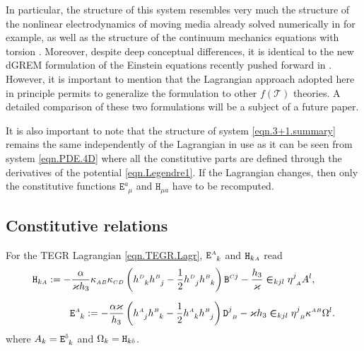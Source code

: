 \documentclass[
10pt, %
a4paper, %
oneside, %
headinclude,footinclude, %
BCOR5mm, %
]{scrartcl}
\newcommand{\sA}{\mathsmaller A}
\newcommand{\sB}{\mathsmaller B}
\newcommand{\sC}{\mathsmaller C}
\newcommand{\sD}{\mathsmaller D}
\newcommand{\mg}[1]{\kappa_{#1}}			%
\newcommand{\MG}[1]{\kappa^{#1}}			%
\newcommand{\tetrsymbol}{h}
\newcommand{\itetrsymbol}{\eta}
\newcommand{\itetr}[2]{\itetrsymbol^{#1}_{\phantom{#1}#2}}
\newcommand{\tetr}[2]{\tetrsymbol^{#1}_{\phantom{#1}#2}}
\newcommand{\detTetr}{\tetrsymbol}
\newcommand{\Dfin}[2]{\mathtt{D}_{\phantom{#2}#1}^{#2}}	%
\newcommand{\Hfin}[2]{\mathtt{H}_{#2#1}}	%
\newcommand{\Efin}[2]{\mathtt{E}^{#1}_{\phantom{#1}#2}}	%
\newcommand{\Ufin}{\mathtt{U}}
\newcommand{\Bfin}[2]{\mathtt{B}^{#1#2}}	%
\newcommand{\LCsymb}{\bm{\in}}    %
\newcommand{\indalg}[1]{\hat{\mathsmaller{#1}}}
\newcommand{\Tscal}{\mathcal{T}}		%
\begin{document}
In particular, the structure of this system resembles very much the structure of the nonlinear 
electrodynamics of 
moving media already solved numerically in \cite{DPRZ2017} for example, as well as the structure of 
the continuum mechanics
equations with torsion \cite{Torsion2019}. Moreover,
despite deep conceptual differences,
it is identical to 
the new dGREM formulation of the Einstein equations recently pushed forward in \cite{Olivares2022}.
However, it is important to mention that the Lagrangian approach adopted here
in principle permits to generalize the formulation to other $f(\Tscal)$ theories.
A detailed comparison of 
these two formulations will be a subject of a future paper.

It is also important to note that the structure of system \eqref{eqn.3+1.summary} remains the same 
independently of the 
Lagrangian in use as it can be seen from system \eqref{eqn.PDE.4D} where all the constitutive parts 
are 
defined through the derivatives of the potential \eqref{eqn.Legendre1}. If the Lagrangian changes, 
then only the constitutive functions $ \Efin{a}{\mu} $ and $ \Hfin{a}{\mu} $ have to be recomputed.

\subsection{Constitutive relations}

For the TEGR Lagrangian \eqref{eqn.TEGR.Lagr}, $ \Efin{\sA}{k} $ and $ \Hfin{\sA}{k} $ read
\begin{subequations}\label{eqn.H.E}
	\begin{align}
		\Hfin{\sA}{k} := %
		-\frac{\alpha}{\varkappa \detTetr_3} 
		\mg{\sA\sB}\mg{\sC\sD} 
		& \left( \tetr{\sD}{k} \tetr{\sB}{j} - \frac12 \tetr{\sD}{j} \tetr{\sB}{k} \right) 
		\Bfin{\sC}{j}
		- 
		\frac{\detTetr_3}{\varkappa} \LCsymb_{kjl} \itetr{j}{\sA} A^l
		,\\[2mm]
		\Efin{\sA}{k} := %
		-\frac{\alpha \varkappa}{\detTetr_3} 
		& \left( \tetr{\sA}{j} \tetr{\sB}{k} - \frac12 \tetr{\sA}{k} \tetr{\sB}{j} \right) 
		\Dfin{\sB}{j} 
		- 
		\varkappa \detTetr_3 \LCsymb_{kjl} 
		\itetr{j}{\sB} \MG{\sA\sB} \Omega^l.
		\label{eqn.E}
	\end{align}
\end{subequations}
where $ A_k = \Efin{\indalg{0}}{k} $ and $ \Omega_k =\Hfin{\indalg{0}}{k}$.
\end{document}
